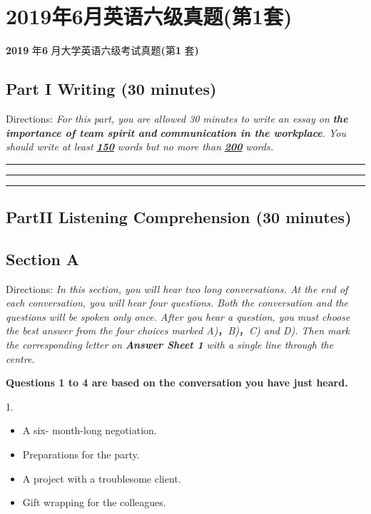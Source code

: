 \documentclass[UTF8,11pt]{ctexart}
\begin{document}
\section*{2019年6月英语六级真题(第1套)}
\textbf{2019} 年\textbf{6} 月大学英语六级考试真题\textbf{(}第\textbf{1} 套\textbf{)}


\subsection*{\textbf{Part I} \textbf{Writing} \textbf{(30 minutes)}}


Directions:\textit{ For this part, you are allowed 30 minutes to write an essay on}\textbf{\textit{ the importance of team spirit and}} \textbf{\textit{communication in the workplace}}\textit{. You should write at least}\textbf{\textit{ }}\textbf{\textit{\uline{150}}}\textit{ words but no more than}\textbf{\textit{ }}\textbf{\textit{\uline{200}}}\textit{ words.} \par\noindent\rule{.95\linewidth}{.4pt}\par  \par\noindent\rule{.95\linewidth}{.4pt}\par  \par\noindent\rule{.95\linewidth}{.4pt}\par


\subsection*{\textbf{Part}II \textbf{Listening Comprehension} \textbf{(30 minutes)}}


\subsection*{\textbf{Section A}}


Directions:\textit{ In this section, you will hear two long conversations. At the end of each conversation, you will hear} \textit{four questions. Both the conversation and the questions will be spoken only once. After you hear a question, you} \textit{must choose the best answer from the four choices marked A)}，\textit{B)}，\textit{C) and D). Then mark the corresponding letter} \textit{on}\textbf{\textit{ Answer Sheet 1}}\textit{ with a single line through the centre.}


\textbf{Questions 1 to 4 are based on the conversation you have just heard.}


1.


\begin{itemize}[leftmargin=2em,itemsep=.2em,topsep=.4em]\item[A.] A six- month-long negotiation.
\item[B.] Preparations for the party.
\item[C.] A project with a troublesome client.
\item[D.] Gift wrapping for the colleagues.
\end{itemize}
\end{document}
